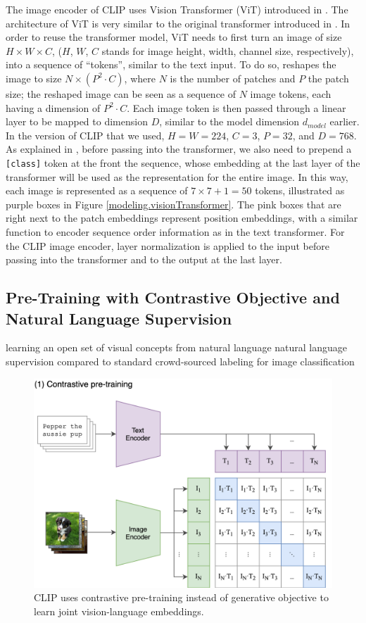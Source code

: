 The image encoder of CLIP uses Vision Transformer (ViT) introduced in \cite{ViT}. The architecture of ViT is very similar to the original transformer introduced in \cite{attentionAllYouNeed}. 
In order to reuse the transformer model, ViT needs to first turn an image of size $H\times W \times C$, ($H$, $W$, $C$ stands for image height, width, channel size, respectively), into a sequence of ``tokens'', similar to the text input.  
To do so, \cite{ViT} reshapes the image to size $N \times (P^2 \cdot C)$, where $N$ is the number of patches and $P$ the patch size; the reshaped image can be seen as a sequence of $N$ image tokens, each having a dimension of $P^2 \cdot C$. Each image token is then passed through a linear layer to be mapped to dimension $D$, similar to the model dimension $d_{model}$ earlier. 
In the version of CLIP that we used, $H = W = 224$, $C = 3$, $P = 32$, and $D = 768$. 
As explained in \cite{ViT}, before passing into the transformer, we also need to prepend a \texttt{[class]} token at the front the sequence, whose embedding at the last layer of the transformer will be used as the representation for the entire image. In this way, each image is represented as a sequence of $7\times 7 + 1 = 50$ tokens, illustrated as purple boxes in Figure \ref{modeling.visionTransformer}. The pink boxes that are right next to the patch embeddings represent position embeddings, with a similar function to encoder sequence order information as in the text transformer. 
For the CLIP image encoder, layer normalization is applied to the input before passing into the transformer and to the output at the last layer.



\subsection{Pre-Training with Contrastive Objective and Natural Language Supervision}
learning an open set of visual concepts from natural language natural language supervision compared to standard crowd-sourced labeling for image classification

\begin{figure}[!htb]
\includegraphics[width=0.7\linewidth]{modeling/CLIP.png}  
\caption{CLIP uses contrastive pre-training instead of generative objective to learn joint vision-language embeddings.}
\label{modeling.clip.pretrainingobj}
\end{figure}

